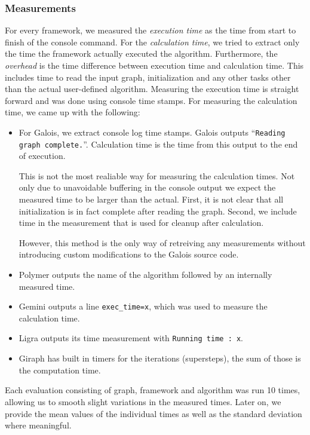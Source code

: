 \subsubsection{Measurements}
For every framework, we measured the \emph{execution time} as the time from start to finish of the console command.
For the \emph{calculation time}, we tried to extract only the time the framework actually executed the algorithm.
Furthermore, the \emph{overhead} is the time difference between execution time and calculation time. This includes time to read the input graph, initialization and any other tasks other than the actual user-defined algorithm.
Measuring the execution time is straight forward and was done using console time stamps.
For measuring the calculation time, we came up with the following:
\begin{itemize}
	\item For Galois, we extract console log time stamps. Galois outputs \enquote{\texttt{Reading graph complete.}}. Calculation time is the time from this output to the end of execution.

	This is not the most realiable way for measuring the calculation times.
	Not only due to unavoidable buffering in the console output we expect the measured time to be larger than the actual.
	First, it is not clear that all initialization is in fact complete after reading the graph. Second, we include time in the measurement that is used for cleanup after calculation.

	However, this method is the only way of retreiving any measurements without introducing custom modifications to the Galois source code.

	\item Polymer outputs the name of the algorithm followed by an internally measured time.

	\item Gemini outputs a line \texttt{exec\_time=x}, which was used to measure the calculation time.

	\item Ligra outputs its time measurement with \texttt{Running time : x}.

	\item Giraph has built in timers for the iterations (supersteps), the sum of those is the computation time.
\end{itemize}
Each evaluation consisting of graph, framework and algorithm was run 10 times, allowing us to smooth slight variations in the measured times.
Later on, we provide the mean values of the individual times as well as the standard deviation where meaningful.
